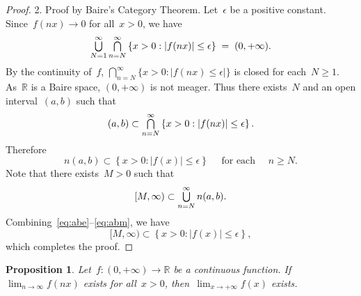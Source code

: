 \documentclass[11pt,a4paper]{article}  %
\newcommand{\bibfile}{baire.bib}  %
\newtheorem{proposition}{Proposition}[section]
\theoremstyle{definition}
\DeclareMathOperator*{\mcap}{\mathsmaller{\bigcap}}
\DeclareMathOperator*{\mcup}{\mathsmaller{\bigcup}}
\def\real{\mathbb{R}}
\numberwithin{equation}{section}
\begin{document}
\begin{proof}
  2. Proof by Baire's Category Theorem. Let~$\epsilon$ be a positive constant. Since~$f(nx)\to 0$
     for all~$x>0$, we have
  \begin{equation}
    \mcup_{N=1}^\infty \mcap_{n=N}^\infty\left\{ x >0 \mathrel{:} |f(nx)| \le \epsilon \right\}
    \;=\; (0,+\infty).
  \end{equation}
  By the continuity of~$f$, $\bigcap_{n=N}^\infty \{x> 0 \mathrel{:} |f(nx)\le \epsilon|\}$ is closed for
  each~$N \ge 1$.
  As~$\real$ is a Baire space, $(0,+\infty)$ is not meager. Thus there exists~$N$ and an open
  interval~$(a, b)$ such that
  \begin{equation}
    (a, b) \subset \mcap_{n=N}^\infty\left\{ x >0 \mathrel{:} |f(nx)| \le \epsilon \right\}.
  \end{equation}
  Therefore
  \begin{equation}
    \label{eq:abe}
    n(a, b) \subset \left\{ x >0 \mathrel{:} |f(x)| \le \epsilon \right\}
    \quad \text{ for each } \quad n\ge N.
  \end{equation}
  Note that there exists~$M >0$ such that
  \begin{equation}
    \label{eq:abm}
    [M, \infty) \subset \mcup_{n=N}^\infty n(a,b).
  \end{equation}
  Combining~\eqref{eq:abe}--\eqref{eq:abm}, we have
  \begin{equation}
    [M, \infty) \subset \left\{ x >0 \mathrel{:} |f(x)| \le \epsilon \right\},
  \end{equation}
  which completes the proof.

\end{proof}

\begin{proposition}
  Let~$f\mathrel{:} (0,+\infty)\to \real$ be a continuous function. If~$\lim_{n\to \infty}f(nx)$
  exists for all~$x>0$, then~$\lim_{x\to +\infty} f(x)$ exists.
\end{proposition}


\small


\end{document}

